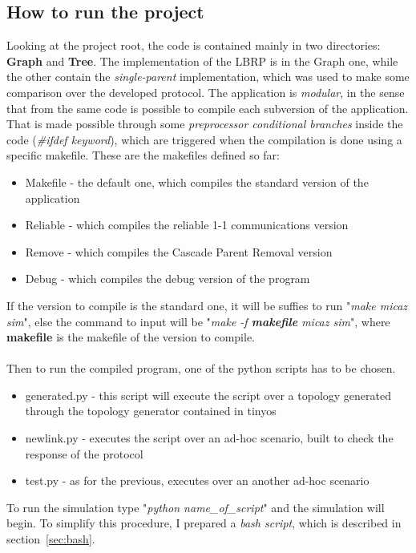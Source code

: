 \documentclass{article}
\begin{document}
\subsection{How to run the project}
Looking at the project root, the code is contained mainly in two directories: \textbf{Graph} and \textbf{Tree}. The implementation of the LBRP is in the Graph one, while the other contain the \textit{single-parent} implementation, which was used to make some comparison over the developed protocol. The application is \textit{modular}, in the sense that from the same code is possible to compile each subversion of the application. That is made possible through some \emph{preprocessor conditional branches} inside the code (\textit{\#ifdef keyword}), which are triggered when the compilation is done using a specific makefile. These are the makefiles defined so far:
\begin{itemize}
  \item Makefile - the default one, which compiles the standard version of the application
  \item Reliable - which compiles the reliable 1-1 communications version
  \item Remove - which compiles the Cascade Parent Removal version
  \item Debug - which compiles the debug version of the program
\end{itemize}

If the version to compile is the standard one, it will be suffies to run "\textit{make micaz sim}", else the command to input will be "\textit{make -f \textbf{makefile} micaz sim}", where \textbf{makefile} is the makefile of the version to compile.\\
\\Then to run the compiled program, one of the python scripts has to be chosen. 
\begin{itemize}
  \item generated.py - this script will execute the script over a topology generated through the topology generator contained in tinyos
  \item newlink.py - executes the script over an ad-hoc scenario, built to check the response of the protocol
  \item test.py - as for the previous, executes over an another ad-hoc scenario
\end{itemize}
To run the simulation type "\textit{python name\_of\_script}" and the simulation will begin.
To simplify this procedure, I prepared a \emph{bash script}, which is described in section~\ref{sec:bash}.
\end{document}
